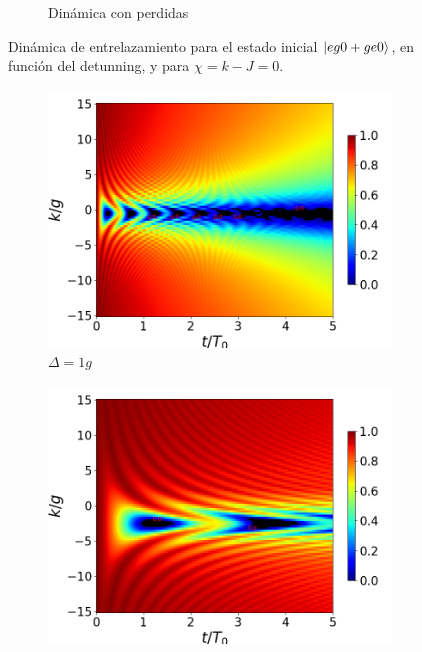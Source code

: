\begin{figure}[h]
\begin{subfigure}{0.49\textwidth}
        \caption{Dinámica con perdidas}
        \label{fig4:concu k 0 dis}
    \end{subfigure}
    \caption{Dinámica de entrelazamiento para el estado inicial $\ket{eg0+ge0}$, en función del detunning, y para $\chi=k-J=0$.}
    \label{fig4:concu k 0}
\end{figure}

\begin{figure}[h]
    \centering
    \begin{subfigure}{0.49\textwidth}
        \includegraphics[width=\textwidth]{figuras/ch4/concu/k/eg0+ge0 d=1.0g x=0.0g J=15.0g gamma=0.25g concu k dis.png}
        \caption{$\Delta=1g$}
        \label{fig4:concu k d1}
    \end{subfigure}
    \hfill
    \begin{subfigure}{0.49\textwidth}
        \includegraphics[width=\textwidth]{figuras/ch4/concu/k/eg0+ge0 d=5.0g x=0.0g J=15.0g gamma=0.25g concu k dis.png}

\end{subfigure}
\end{figure}
